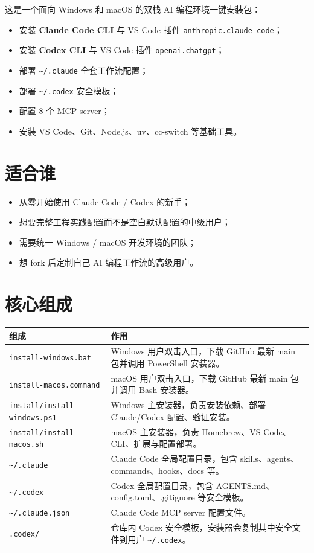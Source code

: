 \documentclass[11pt,a4paper]{ctexbook}
\begin{document}
这是一个面向 Windows 和 macOS 的双栈 AI 编程环境一键安装包：

\begin{itemize}[leftmargin=2em]
  \item 安装 \textbf{Claude Code CLI} 与 VS Code 插件 \texttt{anthropic.claude-code}；
  \item 安装 \textbf{Codex CLI} 与 VS Code 插件 \texttt{openai.chatgpt}；
  \item 部署 \texttt{\textasciitilde/.claude} 全套工作流配置；
  \item 部署 \texttt{\textasciitilde/.codex} 安全模板；
  \item 配置 8 个 MCP server；
  \item 安装 VS Code、Git、Node.js、uv、cc-switch 等基础工具。
\end{itemize}

\section{适合谁}

\begin{itemize}[leftmargin=2em]
  \item 从零开始使用 Claude Code / Codex 的新手；
  \item 想要完整工程实践配置而不是空白默认配置的中级用户；
  \item 需要统一 Windows / macOS 开发环境的团队；
  \item 想 fork 后定制自己 AI 编程工作流的高级用户。
\end{itemize}

\section{核心组成}

\begin{longtable}{p{}p{}}
\toprule
组成 & 作用 \\
\midrule
\texttt{install-windows.bat} & Windows 用户双击入口，下载 GitHub 最新 main 包并调用 PowerShell 安装器。 \\
\texttt{install-macos.command} & macOS 用户双击入口，下载 GitHub 最新 main 包并调用 Bash 安装器。 \\
\texttt{install/install-windows.ps1} & Windows 主安装器，负责安装依赖、部署 Claude/Codex 配置、验证安装。 \\
\texttt{install/install-macos.sh} & macOS 主安装器，负责 Homebrew、VS Code、CLI、扩展与配置部署。 \\
\texttt{\textasciitilde/.claude} & Claude Code 全局配置目录，包含 skills、agents、commands、hooks、docs 等。 \\
\texttt{\textasciitilde/.codex} & Codex 全局配置目录，包含 AGENTS.md、config.toml、.gitignore 等安全模板。 \\
\texttt{\textasciitilde/.claude.json} & Claude Code MCP server 配置文件。 \\
\texttt{.codex/} & 仓库内 Codex 安全模板，安装器会复制其中安全文件到用户 \texttt{\textasciitilde/.codex}。 \\
\bottomrule
\end{longtable}
\end{document}
